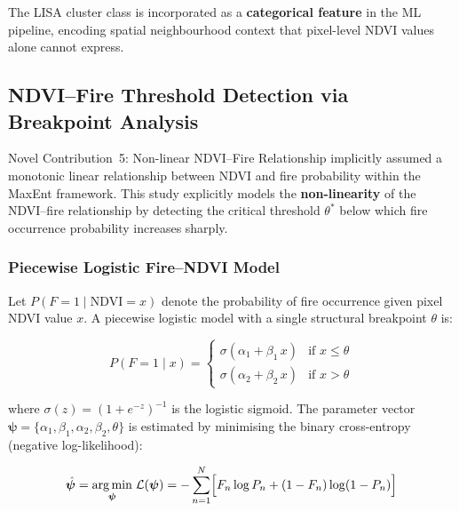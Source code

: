 \documentclass[12pt, a4paper]{article}
\begin{document}
The LISA cluster class is incorporated as a \textbf{categorical feature}
in the ML pipeline, encoding spatial neighbourhood context that
pixel-level NDVI values alone cannot express.

\subsection{NDVI--Fire Threshold Detection via Breakpoint Analysis}
\label{sec:threshold}

\begin{novelbox}{Novel Contribution~5: Non-linear NDVI--Fire Relationship}
\citet{biswas2025} implicitly assumed a monotonic linear relationship
between NDVI and fire probability within the MaxEnt framework. This
study explicitly models the \textbf{non-linearity} of the NDVI--fire
relationship by detecting the critical threshold $\theta^{*}$ below
which fire occurrence probability increases sharply.
\end{novelbox}

\subsubsection{Piecewise Logistic Fire--NDVI Model}
\label{sec:piecewise}

Let $P(F = 1 \mid \text{NDVI} = x)$ denote the probability of fire
occurrence given pixel NDVI value $x$. A piecewise logistic model with
a single structural breakpoint $\theta$ is:

\begin{equation}
    P(F = 1 \mid x) =
    \begin{cases}
        \sigma\!\left(\alpha_{1} + \beta_{1}\,x\right) &
            \text{if } x \leq \theta \\[6pt]
        \sigma\!\left(\alpha_{2} + \beta_{2}\,x\right) &
            \text{if } x > \theta
    \end{cases}
    \label{eq:piecewise_logistic}
\end{equation}

where $\sigma(z) = (1 + e^{-z})^{-1}$ is the logistic sigmoid.
The parameter vector $\bm{\psi} = \{\alpha_1, \beta_1, \alpha_2,
\beta_2, \theta\}$ is estimated by minimising the binary
cross-entropy (negative log-likelihood):

\begin{equation}
    \hat{\bm{\psi}} =
    \underset{\bm{\psi}}{\arg\min}\;
    \mathcal{L}(\bm{\psi}) =
    -\sum_{n=1}^{N}
    \Bigl[
        F_n \log P_n + (1 - F_n)\log(1 - P_n)
    \Bigr]
    \label{eq:nll}
\end{equation}
\end{document}
